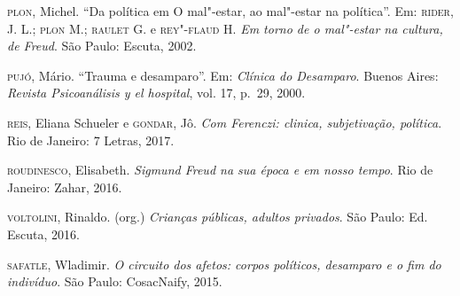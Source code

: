 \begin{Parskip}
\textsc{plon}, Michel. ``Da política em O mal"-estar, ao mal"-estar na política''. Em: \textsc{rider}, J. L.; \textsc{plon }M.; \textsc{raulet} G. e \textsc{rey"-flaud} H. \emph{Em torno de o mal"-estar na cultura, de Freud}. São Paulo: Escuta, 2002.

\textsc{pujó}, Mário. ``Trauma e desamparo''. Em: \emph{Clínica do Desamparo}. Buenos Aires:
\emph{Revista Psicoanálisis y el hospital}, vol. 17, p.~29, 2000.

\textsc{reis}, Eliana Schueler e \textsc{gondar}, Jô. \emph{Com Ferenczi: clinica, subjetivação, política}. Rio de Janeiro: 7 Letras, 2017.

\textsc{roudinesco}, Elisabeth. \emph{Sigmund Freud na sua época e em nosso tempo}. Rio de
Janeiro: Zahar, 2016.

\textsc{voltolini}, Rinaldo. (org.) \emph{Crianças públicas, adultos privados}. São Paulo: Ed.
Escuta, 2016.

\textsc{safatle}, Wladimir. \emph{O circuito dos afetos: corpos políticos, desamparo e o fim
do indivíduo}. São Paulo: CosacNaify, 2015.
\end{Parskip}